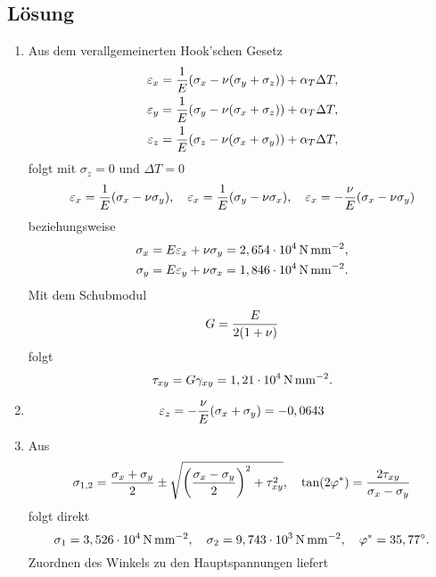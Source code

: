 \documentclass{exercise}
\begin{document}
    \subsection*{Lösung}
    \begin{enumerate}
        \item Aus dem verallgemeinerten Hook'schen Gesetz
        \begin{align*}
            \varepsilon_x &= \frac{1}{E}\parentheses*{\sigma_x - \nu\parentheses*{\sigma_y + \sigma_z}} + \alpha_T\Delta T,\\
            \varepsilon_y &= \frac{1}{E}\parentheses*{\sigma_y - \nu\parentheses*{\sigma_x + \sigma_z}} + \alpha_T\Delta T,\\
            \varepsilon_z &= \frac{1}{E}\parentheses*{\sigma_z - \nu\parentheses*{\sigma_x + \sigma_y}} + \alpha_T\Delta T,
        \end{align*}
        folgt mit \(\sigma_z = 0\) und \(\Delta T = 0\)
        \[
            \varepsilon_x = \frac{1}{E}\parentheses*{\sigma_x - \nu\sigma_y}, \quad \varepsilon_x = \frac{1}{E}\parentheses*{\sigma_y - \nu\sigma_x}, \quad \varepsilon_x = -\frac{\nu}{E}\parentheses*{\sigma_x - \nu\sigma_y}
        \]
        beziehungsweise
        \begin{align*}
            \sigma_x &= E\varepsilon_x + \nu\sigma_y = 2,654 \cdot 10^4\,\si{\newton\per\milli\meter\squared},\\
            \sigma_y &= E\varepsilon_y + \nu\sigma_x = 1,846 \cdot 10^4\,\si{\newton\per\milli\meter\squared}.
        \end{align*}
        Mit dem Schubmodul
        \[
            G = \frac{E}{2\parentheses*{1 + \nu}}
        \]
        folgt
        \[
            \tau_{xy} = G\gamma_{xy} = 1,21 \cdot 10^4\,\si{\newton\per\milli\meter\squared}.
        \]
        \item
        \[
            \varepsilon_z = -\frac{\nu}{E}\parentheses*{\sigma_x + \sigma_y} = -0,0643
        \]
        \item Aus
        \[
            \sigma_{1, 2} = \frac{\sigma_x + \sigma_y}{2} \pm \sqrt{\parentheses*{\frac{\sigma_x - \sigma_y}{2}}^2 + \tau_{xy}^2}, \quad \tan\parentheses*{2\varphi^*} = \frac{2\tau_{xy}}{\sigma_x - \sigma_y}
        \]
        folgt direkt
        \[
            \sigma_1 = 3,526 \cdot 10^4\,\si{\newton\per\milli\meter\squared}, \quad \sigma_2 = 9,743 \cdot 10^3\,\si{\newton\per\milli\meter\squared}, \quad \varphi^* = 35,77^\circ.
        \]
        Zuordnen des Winkels zu den Hauptspannungen liefert

\end{enumerate}
\end{document}
